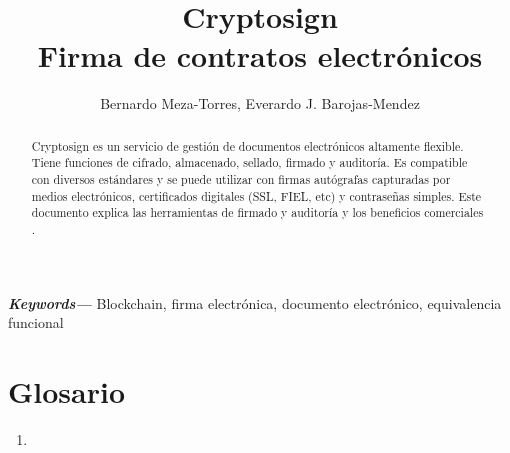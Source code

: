 \documentclass[letterpaper, 12pt]{article}
\title{Cryptosign\\
Firma de contratos electrónicos\\
}
\author{Bernardo Meza-Torres, Everardo J. Barojas-Mendez}
\providecommand{\keywords}[1]{\textbf{\textit{Keywords---}} #1}
\begin{document}
\maketitle

\begin{abstract}
Cryptosign es un servicio de gestión de documentos electrónicos altamente flexible. Tiene funciones de cifrado, almacenado, sellado, firmado y auditoría. Es compatible con diversos estándares y se puede utilizar con firmas autógrafas capturadas por medios electrónicos, certificados digitales (SSL, FIEL, etc) y contraseñas simples. Este documento explica las herramientas de firmado y auditoría y los beneficios comerciales \cite{Civic}.
\end{abstract}

\setlength\parindent{.45in} \keywords{Blockchain, firma electrónica, documento electrónico, equivalencia funcional}

\clearpage

\tableofcontents
\listoffigures

\section*{Glosario}
\begin{enumerate}
    \item 
\end{enumerate}


\clearpage


\end{document}
